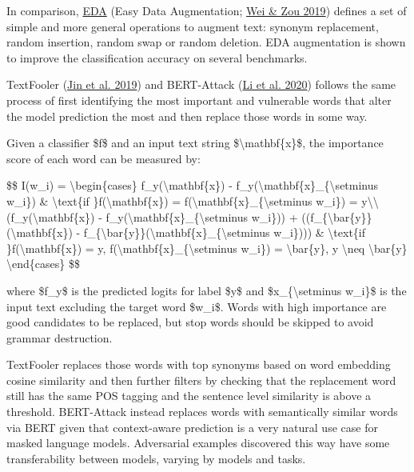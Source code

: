 In comparison, \href{https://lilianweng.github.io/posts/2022-04-15-data-gen/\#EDA}{EDA} (Easy Data Augmentation; \href{https://arxiv.org/abs/1901.11196}{Wei \& Zou 2019}) defines a set of simple and more general operations to augment text: synonym replacement, random insertion, random swap or random deletion. EDA augmentation is shown to improve the classification accuracy on several benchmarks.

TextFooler (\href{https://arxiv.org/abs/1907.11932}{Jin et al. 2019}) and \label{BERT-Attack}{}BERT-Attack (\href{https://aclanthology.org/2020.emnlp-main.500.pdf}{Li et al. 2020}) follows the same process of first identifying the most important and vulnerable words that alter the model prediction the most and then replace those words in some way.

Given a classifier \$f\$ and an input text string \$\textbackslash mathbf\{x\}\$, the importance score of each word can be measured by:

\$\$ I(w\_i) = \textbackslash begin\{cases\} f\_y(\textbackslash mathbf\{x\}) - f\_y(\textbackslash mathbf\{x\}\_\{\textbackslash setminus w\_i\}) \& \textbackslash text\{if \}f(\textbackslash mathbf\{x\}) = f(\textbackslash mathbf\{x\}\_\{\textbackslash setminus w\_i\}) = y\textbackslash\textbackslash{} (f\_y(\textbackslash mathbf\{x\}) - f\_y(\textbackslash mathbf\{x\}\_\{\textbackslash setminus w\_i\})) + ((f\_\{\textbackslash bar\{y\}\}(\textbackslash mathbf\{x\}) - f\_\{\textbackslash bar\{y\}\}(\textbackslash mathbf\{x\}\_\{\textbackslash setminus w\_i\}))) \& \textbackslash text\{if \}f(\textbackslash mathbf\{x\}) = y, f(\textbackslash mathbf\{x\}\_\{\textbackslash setminus w\_i\}) = \textbackslash bar\{y\}, y \textbackslash neq \textbackslash bar\{y\} \textbackslash end\{cases\} \$\$

where \$f\_y\$ is the predicted logits for label \$y\$ and \$x\_\{\textbackslash setminus w\_i\}\$ is the input text excluding the target word \$w\_i\$. Words with high importance are good candidates to be replaced, but stop words should be skipped to avoid grammar destruction.

TextFooler replaces those words with top synonyms based on word embedding cosine similarity and then further filters by checking that the replacement word still has the same POS tagging and the sentence level similarity is above a threshold. BERT-Attack instead replaces words with semantically similar words via BERT given that context-aware prediction is a very natural use case for masked language models. Adversarial examples discovered this way have some transferability between models, varying by models and tasks.

